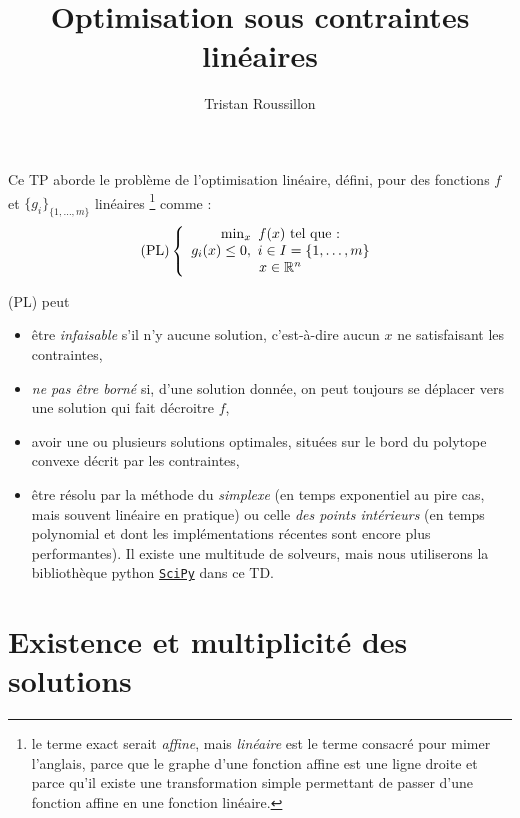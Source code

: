 \documentclass[a4paper,francais]{article}
\title{Optimisation sous contraintes linéaires}
\author{Tristan Roussillon}
\newcommand{\R}{{\ensuremath\mathbb{R}}}
\theoremstyle{definition}
\begin{document}
\maketitle

Ce TP aborde le problème de l'optimisation linéaire, défini,
pour des fonctions $f$ et $\{g_i\}_{\{1, \dots, m\}}$ linéaires
\footnote{le terme exact serait \emph{affine}, mais \emph{linéaire}
  est le terme consacré pour mimer l'anglais, parce que le graphe
  d'une fonction affine est une ligne droite et parce qu'il
  existe une transformation simple permettant de passer d'une
  fonction affine en une fonction linéaire.}
comme :
\[
\text{(PL)} \left\{
\begin{array}{c}
  \min_{x} \ f(x) \ \text{tel que :} \\
  g_i(x) \leq 0, \ i \in I = \{1, \dots, m\} \\
  x \in  \R^n \\
\end{array}
\right.
\]

(PL) peut
\begin{itemize}
\item être \emph{infaisable} s'il n'y aucune solution,
  c'est-à-dire aucun $x$ ne satisfaisant les contraintes,
\item \emph{ne pas être borné} si, d'une solution donnée, on peut
  toujours se déplacer vers une solution qui fait décroitre $f$,
\item avoir une ou plusieurs solutions optimales, situées
  sur le bord du polytope convexe décrit par les contraintes,
\item être résolu par la méthode du \emph{simplexe}
  (en temps exponentiel au pire cas, mais souvent linéaire en
  pratique) ou celle \emph{des points intérieurs} (en temps
  polynomial et dont les implémentations récentes sont encore
  plus performantes). Il existe une multitude de solveurs,
  mais nous utiliserons la bibliothèque python
  \href{https://docs.scipy.org/doc/}{\texttt{SciPy}} dans
  ce TD.
\end{itemize} 

\section{Existence et multiplicité des solutions}
\label{sec:sol}
\end{document}
